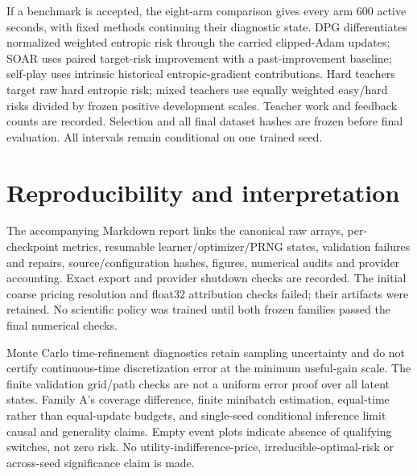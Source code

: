 \documentclass{article}
\begin{document}
If a benchmark is accepted, the eight-arm comparison gives every arm 600 active seconds, with fixed methods continuing their diagnostic state. DPG differentiates normalized weighted entropic risk through the carried clipped-Adam updates; SOAR uses paired target-risk improvement with a past-improvement baseline; self-play uses intrinsic historical entropic-gradient contributions. Hard teachers target raw hard entropic risk; mixed teachers use equally weighted easy/hard risks divided by frozen positive development scales. Teacher work and feedback counts are recorded. Selection and all final dataset hashes are frozen before final evaluation. All intervals remain conditional on one trained seed.

\section*{Reproducibility and interpretation}
The accompanying Markdown report links the canonical raw arrays, per-checkpoint metrics, resumable learner/optimizer/PRNG states, validation failures and repairs, source/configuration hashes, figures, numerical audits and provider accounting. Exact export and provider shutdown checks are recorded. The initial coarse pricing resolution and float32 attribution checks failed; their artifacts were retained. No scientific policy was trained until both frozen families passed the final numerical checks.

Monte Carlo time-refinement diagnostics retain sampling uncertainty and do not certify continuous-time discretization error at the minimum useful-gain scale. The finite validation grid/path checks are not a uniform error proof over all latent states. Family A's coverage difference, finite minibatch estimation, equal-time rather than equal-update budgets, and single-seed conditional inference limit causal and generality claims. Empty event plots indicate absence of qualifying switches, not zero risk. No utility-indifference-price, irreducible-optimal-risk or across-seed significance claim is made.
\end{document}
